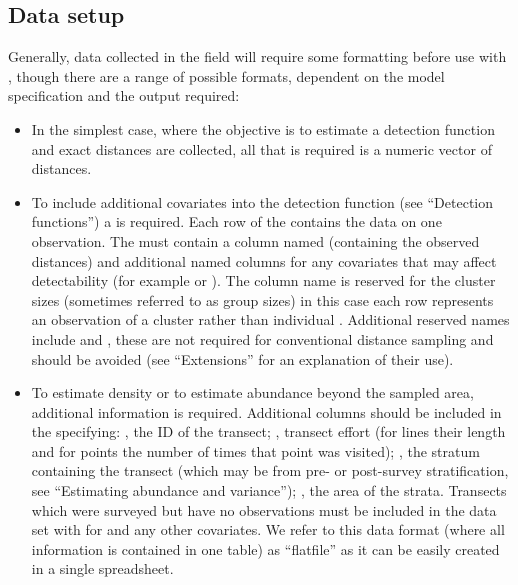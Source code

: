 \documentclass[article]{jss}\usepackage[]{graphicx}\usepackage[]{color}
\begin{document}
\subsection{Data setup}

Generally, data collected in the field will require some formatting before use with , though there are a range of possible formats, dependent on the model specification and the output required:

\begin{itemize}
\item In the simplest case, where the objective is to estimate a detection function and exact distances are collected, all that is required is a numeric vector of distances.
\item To include additional covariates into the detection function (see ``Detection functions'') a  is required. Each row of the  contains the data on one observation. The  must contain a column named  (containing the observed distances) and additional named columns for any covariates that may affect detectability (for example  or ). The column name  is reserved for the cluster sizes (sometimes referred to as group sizes) in this case each row represents an observation of a cluster rather than individual \citep[see][Section 1.4.3 for more on defining clusters and ``Extensions'' below for one approach to dealing with uncertain cluster size]{Buckland:2001vm}. Additional reserved names include  and , these are not required for conventional distance sampling and should be avoided (see ``Extensions'' for an explanation of their use).
\item To estimate density or to estimate abundance beyond the sampled area, additional information is required. Additional columns should be included in the  specifying: , the ID of the transect; , transect effort (for lines their length and for points the number of times that point was visited); , the stratum containing the transect (which may be from pre- or post-survey stratification, see ``Estimating abundance and variance''); , the area of the strata. Transects which were surveyed but have no observations must be included in the data set with  for  and any other covariates. We refer to this data format (where all information is contained in one table) as ``flatfile'' as it can be easily created in a single spreadsheet.
\end{itemize}
\end{document}
